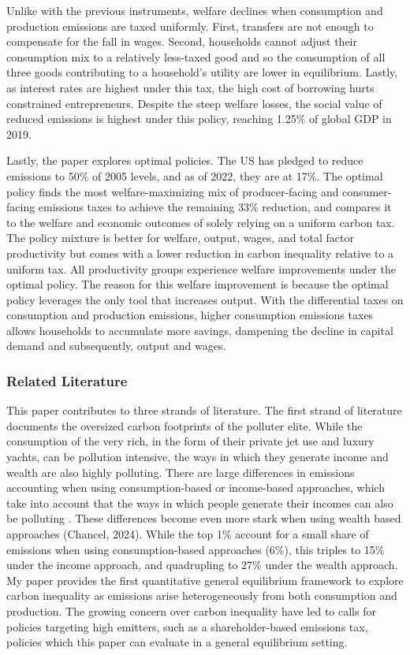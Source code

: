 \documentclass[12pt,a4paper]{article}
\begin{document}
\hspace*{6mm} Unlike with the previous instruments, welfare declines when consumption and production emissions are taxed uniformly. First, transfers are not enough to compensate for the fall in wages. Second, households cannot adjust their consumption mix to a relatively less-taxed good and so the consumption of all three goods contributing to a household's utility are lower in equilibrium. Lastly, as interest rates are highest under this tax, the high cost of borrowing hurts constrained entrepreneurs. Despite the steep welfare losses, the social value of reduced emissions is highest under this policy, reaching 1.25\% of global GDP in 2019. 

\hspace*{6mm} Lastly, the paper explores optimal policies. The US has pledged to reduce emissions to 50\% of 2005 levels, and as of 2022, they are at 17\%. The optimal policy finds the most welfare-maximizing mix of producer-facing and consumer-facing emissions taxes to achieve the remaining 33\% reduction, and compares it to the welfare and economic outcomes of solely relying on a uniform carbon tax. The policy mixture is better for welfare, output, wages, and total factor productivity but comes with a lower reduction in carbon inequality relative to a uniform tax. All productivity groups experience welfare improvements under the optimal policy. The reason for this welfare improvement is because the optimal policy leverages the only tool that increases output. With the differential taxes on consumption and production emissions, higher consumption emissions taxes allows households to accumulate more savings, dampening the decline in capital demand and subsequently, output and wages. 
  
\subsubsection*{Related Literature}	
\hspace*{6mm} This paper contributes to three strands of literature. The first strand of literature documents the oversized carbon footprints of the polluter elite. While the consumption of the very rich, in the form of their private jet use and luxury yachts, can be pollution intensive, the ways in which they generate income and wealth are also highly polluting. There are large differences in emissions accounting when using consumption-based or income-based approaches, which take into account that the ways in which people generate their incomes can also be polluting  \citep{starr2023assessing, starr2023income}. These differences become even more stark when using wealth based approaches (Chancel, 2024). While the top 1\% account for a small share of emissions when using consumption-based approaches (6\%), this triples to 15\% under the income approach, and quadrupling to 27\% under the wealth approach. My paper provides the first quantitative general equilibrium framework to explore carbon inequality as emissions arise heterogeneously from both consumption and production. The growing concern over carbon inequality have led to calls for policies targeting high emitters, such as a shareholder-based emissions tax, policies which this paper can evaluate in a general equilibrium setting.
\end{document}
